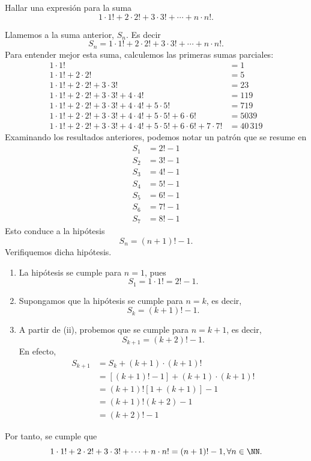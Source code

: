\begin{examplebox}{}{}
    Hallar una expresión para la suma
    $$1 \cdot 1! + 2 \cdot 2! + 3 \cdot 3! + \cdots + n \cdot n!.$$

    \tcblower
    \demostracion Llamemos a la suma anterior, $S_n$. Es decir
    $$S_n=1 \cdot 1! + 2 \cdot 2! + 3 \cdot 3! + \cdots + n \cdot n!.$$
    Para entender mejor esta suma, calculemos las primeras sumas parciales:
    \begin{align*}
        1 \cdot 1! & = 1 \\
        1 \cdot 1! + 2 \cdot 2! & = 5 \\
        1 \cdot 1! + 2 \cdot 2! + 3 \cdot 3! & = 23 \\
        1 \cdot 1! + 2 \cdot 2! + 3 \cdot 3! + 4 \cdot 4! & = 119 \\
        1 \cdot 1! + 2 \cdot 2! + 3 \cdot 3! + 4 \cdot 4! + 5 \cdot 5! & = 719 \\
        1 \cdot 1! + 2 \cdot 2! + 3 \cdot 3! + 4 \cdot 4! + 5 \cdot 5! + 6 \cdot 6! & = 5039 \\
        1 \cdot 1! + 2 \cdot 2! + 3 \cdot 3! + 4 \cdot 4! + 5 \cdot 5! + 6 \cdot 6! + 7 \cdot 7! & = 40 \, 319
    \end{align*}
    Examinando los resultados anteriores, podemos notar un patrón que se resume en
    \begin{align*}
        S_1 & = 2! - 1 \\
        S_2 & = 3! - 1 \\
        S_3 & = 4! - 1 \\
        S_4 & = 5! - 1 \\
        S_5 & = 6! - 1 \\
        S_6 & = 7! - 1 \\
        S_7 & = 8! - 1
    \end{align*}
    Esto conduce a la hipótesis
    $$S_n = (n + 1)! - 1.$$
    Verifiquemos dicha hipótesis.
    \begin{enumerate}[label=\roman*., topsep=6pt, itemsep=0pt]
        \item La hipótesis se cumple para $n=1$, pues
        $$S_1=1 \cdot 1!=2!-1.$$
        \item Supongamos que la hipótesis se cumple para $n=k$, es decir,
        $$S_k=(k+1)!-1.$$
        \item A partir de (ii), probemos que se cumple para $n=k+1$, es decir,
        $$S_{k+1}=(k+2)!-1.$$
        En efecto,
        \begin{align*}
            S_{k+1} &= S_k + (k+1) \cdot (k+1)! \\
            &=[(k+1)!-1]+(k+1) \cdot (k+1)! \\
            &=(k+1)![1+(k+1)]-1 \\
            &=(k+1)!(k+2)-1 \\
            &=(k+2)!-1
        \end{align*}
    \end{enumerate}
    Por tanto, se cumple que
    $$1 \cdot 1! + 2 \cdot 2! + 3 \cdot 3! + \cdots + n \cdot n! = (n+1)!-1, \forall n \in \NN .$$
\end{examplebox}

